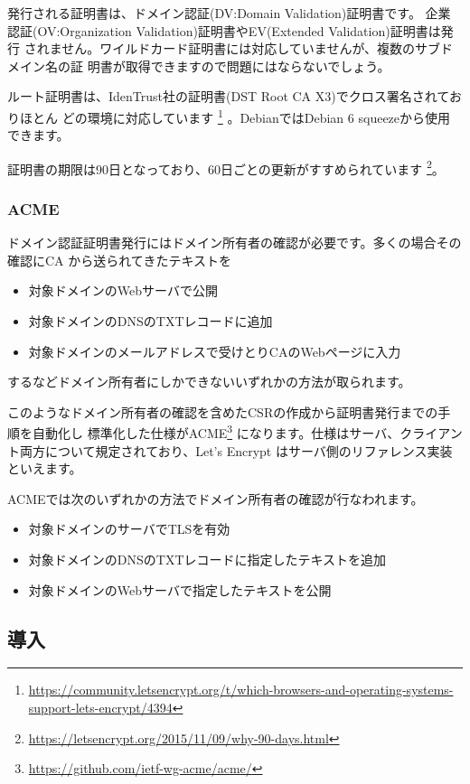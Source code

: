 \documentclass[mingoth,a4paper]{jsarticle}
\begin{document}
発行される証明書は、ドメイン認証(DV:Domain Validation)証明書です。
企業認証(OV:Organization Validation)証明書やEV(Extended Validation)証明書は発行
されません。ワイルドカード証明書には対応していませんが、複数のサブドメイン名の証
明書が取得できますので問題にはならないでしょう。

ルート証明書は、IdenTrust社の証明書(DST Root CA X3)でクロス署名されておりほとん
どの環境に対応しています
\footnote{\url{https://community.letsencrypt.org/t/which-browsers-and-operating-systems-support-lets-encrypt/4394}}
。DebianではDebian 6 squeezeから使用できます。

証明書の期限は90日となっており、60日ごとの更新がすすめられています
\footnote{\url{https://letsencrypt.org/2015/11/09/why-90-days.html}}。

\subsubsection{ACME}

ドメイン認証証明書発行にはドメイン所有者の確認が必要です。多くの場合その確認にCA
から送られてきたテキストを
\begin{itemize}
\item 対象ドメインのWebサーバで公開
\item 対象ドメインのDNSのTXTレコードに追加
\item 対象ドメインのメールアドレスで受けとりCAのWebページに入力
\end{itemize}
するなどドメイン所有者にしかできないいずれかの方法が取られます。

このようなドメイン所有者の確認を含めたCSRの作成から証明書発行までの手順を自動化し
標準化した仕様がACME\footnote{\url{https://github.com/ietf-wg-acme/acme/}}
になります。仕様はサーバ、クライアント両方について規定されており、Let's Encrypt
はサーバ側のリファレンス実装といえます。

ACMEでは次のいずれかの方法でドメイン所有者の確認が行なわれます。
\begin{itemize}
\item 対象ドメインのサーバでTLSを有効
\item 対象ドメインのDNSのTXTレコードに指定したテキストを追加
\item 対象ドメインのWebサーバで指定したテキストを公開
\end{itemize}

\subsection{導入}
\end{document}
